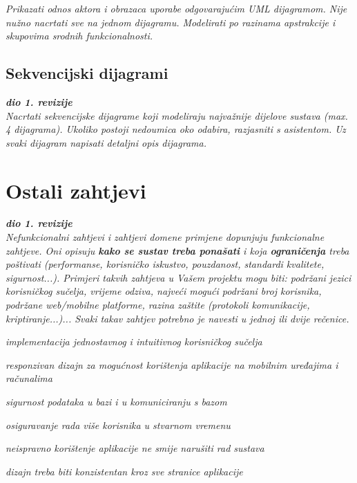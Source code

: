 					\textit{Prikazati odnos aktora i obrazaca uporabe odgovarajućim UML dijagramom. Nije nužno nacrtati sve na jednom dijagramu. Modelirati po razinama apstrakcije i skupovima srodnih funkcionalnosti.}
				\eject		
				
			\subsection{Sekvencijski dijagrami}
				
				\textbf{\textit{dio 1. revizije}}\\
				
				\textit{Nacrtati sekvencijske dijagrame koji modeliraju najvažnije dijelove sustava (max. 4 dijagrama). Ukoliko postoji nedoumica oko odabira, razjasniti s asistentom. Uz svaki dijagram napisati detaljni opis dijagrama.}
				\eject
	
		\section{Ostali zahtjevi}
		
			\textbf{\textit{dio 1. revizije}}\\
		 
			 \textit{Nefunkcionalni zahtjevi i zahtjevi domene primjene dopunjuju funkcionalne zahtjeve. Oni opisuju \textbf{kako se sustav treba ponašati} i koja \textbf{ograničenja} treba poštivati (performanse, korisničko iskustvo, pouzdanost, standardi kvalitete, sigurnost...). Primjeri takvih zahtjeva u Vašem projektu mogu biti: podržani jezici korisničkog sučelja, vrijeme odziva, najveći mogući podržani broj korisnika, podržane web/mobilne platforme, razina zaštite (protokoli komunikacije, kriptiranje...)... Svaki takav zahtjev potrebno je navesti u jednoj ili dvije rečenice.}

			 \begin{packed_item}
				\item \textit{implementacija jednostavnog i intuitivnog korisničkog sučelja}
				\item \textit{responzivan dizajn za mogućnost korištenja aplikacije na mobilnim uređajima i računalima}
				\item \textit{sigurnost podataka u bazi i u komuniciranju s bazom}
				\item \textit{osiguravanje rada više korisnika u stvarnom vremenu}
				\item \textit{neispravno korištenje aplikacije ne smije narušiti rad sustava}
				\item \textit{dizajn treba biti konzistentan kroz sve stranice aplikacije}
			\end{packed_item}


			 
			 
			 
	
